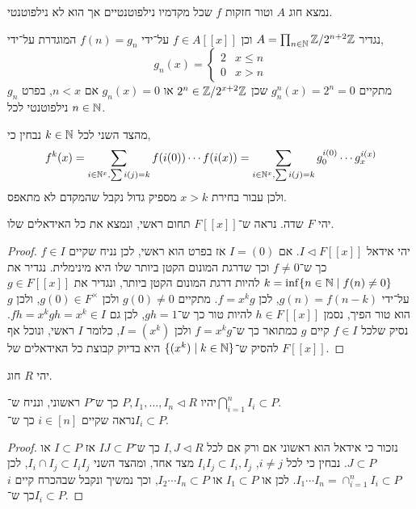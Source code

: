\subquestion{}
נמצא חוג $A$ וטור חזקות $f$ שכל מקדמיו נילפוטנטיים אך הוא לא נילפוטנטי.
\begin{solution}
	נגדיר $A = \prod_{n \in \mathbb{N}} \mathbb{Z} / 2^{n + 2} \mathbb{Z}$ וכן $f \in A[[x]]$ על־ידי $f(n) = g_n$ המוגדרת על־ידי,
	\[
		g_n(x)
		= \begin{cases}
			2 & x \le n \\
			0 & x > n
		\end{cases}
	\]
	מתקיים $g_n^n(x) = 2^n = 0$ שכן $2^n \in \mathbb{Z} / 2^{x + 2} \mathbb{Z}$ או $g_n(x) = 0$ אם $n < x$, בפרט $g_n$ נילפוטנטי לכל $n \in \mathbb{N}$.

	מהצד השני לכל $k \in \mathbb{N}$ נבחין כי,
	\[
		f^k(x)
		= \sum_{i \in \mathbb{N}^x, \sum i(j) = k} f(i(0)) \cdots f(i(x))
		= \sum_{i \in \mathbb{N}^x, \sum i(j) = k} g_0^{i(0)} \cdots g_x^{i(x)}
	\]
	ולכן עבור בחירת $x > k$ מספיק גדול נקבל שהמקדם לא מתאפס.
\end{solution}

\question{}
יהי $F$ שדה. נראה ש־$F[[x]]$ תחום ראשי, ונמצא את כל האידאלים שלו.
\begin{proof}
	יהי אידאל $I \triangleleft F[[x]]$.
	אם $I = (0)$ אז בפרט הוא ראשי, לכן נניח שקיים $f \in I$ כך ש־$f \ne 0$ וכך שדרגת המונום הקטן ביותר שלו היא מינימלית.
	נגדיר את $k = \inf\{ n \in \mathbb{N} \mid f(n) \ne 0 \}$ להיות דרגת המונום הקטן ביותר, ונגדיר את $g \in F[[x]]$ על־ידי $g(n) = f(n - k)$, לכן $f = x^k g$.
	מתקיים $g(0) \ne 0$ ולכן $g(0) \in F^\times$, ולכן $g$ הוא טור הפיך, נסמן $h \in F[[x]]$ להיות טור כך ש־$g h = 1$, לכן גם $f h = x^k g h = x^k \in I$.
	נסיק שלכל $f \in I$ קיים $g$ כמתואר כך ש־$f = x^k g$ ולכן $I = (x^k)$, כלומר $I$ ראשי, ונוכל אף להסיק ש־$\{ (x^k) \mid k \in \mathbb{N} \}$ היא בדיוק קבוצת כל האידאלים של $F[[x]]$.
\end{proof}

\question{}
יהי $R$ חוג.

\subquestion{}
יהיו $P, I_1, \ldots, I_n \triangleleft R$ כך ש־$P$ ראשוני, ונניח ש־$\bigcap_{i = 1}^n I_i \subset P$. \\
נראה שקיים $i \in [n]$ כך ש־$I_i \subset P$.
\begin{proof}
	נזכור כי אידאל הוא ראשוני אם ורק אם לכל $I, J \triangleleft R$ כך ש־$I J \subset P$ אז $I \subset P$ או $J \subset P$.
	נבחין כי לכל $i \ne j$, $I_i I_j \subset I_i, I_j$ מצד אחד, ומהצד השני $I_i \cap I_j \subset I_i I_j$, לכן $I_1 \cdots I_n = \cap_{i = 1}^n I_i \subset P$.
	לכן או $I_1 \subset P$ או $I_2 \cdots I_n \subset P$, וכך נמשיך ונקבל שבהכרח קיים $i$ כך ש־$I_i \subset P$.
\end{proof}

